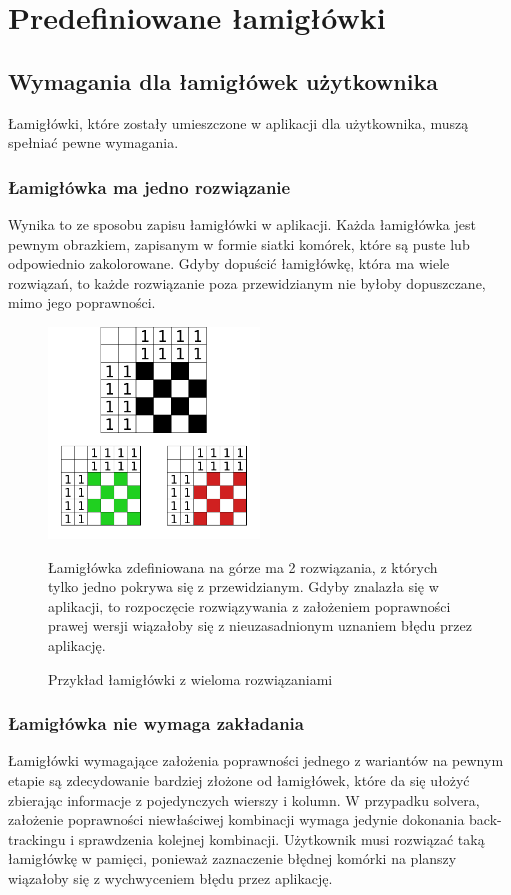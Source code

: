 \section{Predefiniowane łamigłówki}


\subsection{Wymagania dla łamigłówek użytkownika}
    Łamigłówki, które zostały umieszczone w aplikacji dla użytkownika, muszą spełniać pewne wymagania.

\subsubsection{Łamigłówka ma jedno rozwiązanie}
    Wynika to ze sposobu zapisu łamigłówki w aplikacji. Każda łamigłówka jest pewnym obrazkiem,
zapisanym w formie siatki komórek, które są puste lub odpowiednio zakolorowane. Gdyby dopuścić
łamigłówkę, która ma wiele rozwiązań, to każde rozwiązanie poza przewidzianym nie byłoby dopuszczane,
mimo jego poprawności.

\begin{figure}[!h]
    \centering
    \includegraphics[width=0.5\textwidth]{images/no_unique_solution.png}
    \caption{Przykład łamigłówki z wieloma rozwiązaniami}
    Łamigłówka zdefiniowana na górze ma 2 rozwiązania, z których tylko jedno pokrywa się
z przewidzianym. Gdyby znalazła się w aplikacji, to rozpoczęcie rozwiązywania z założeniem 
poprawności prawej wersji wiązałoby się z nieuzasadnionym uznaniem błędu przez aplikację.
\end{figure}

\subsubsection{Łamigłówka nie wymaga zakładania}
    Łamigłówki wymagające założenia poprawności jednego z wariantów na pewnym etapie są zdecydowanie
bardziej złożone od łamigłówek, które da się ułożyć zbierając informacje z pojedynczych wierszy i kolumn.
W przypadku solvera, założenie poprawności niewłaściwej kombinacji wymaga jedynie dokonania back-trackingu
i sprawdzenia kolejnej kombinacji. Użytkownik musi rozwiązać taką łamigłówkę w pamięci, ponieważ
zaznaczenie błędnej komórki na planszy wiązałoby się z wychwyceniem błędu przez aplikację.


